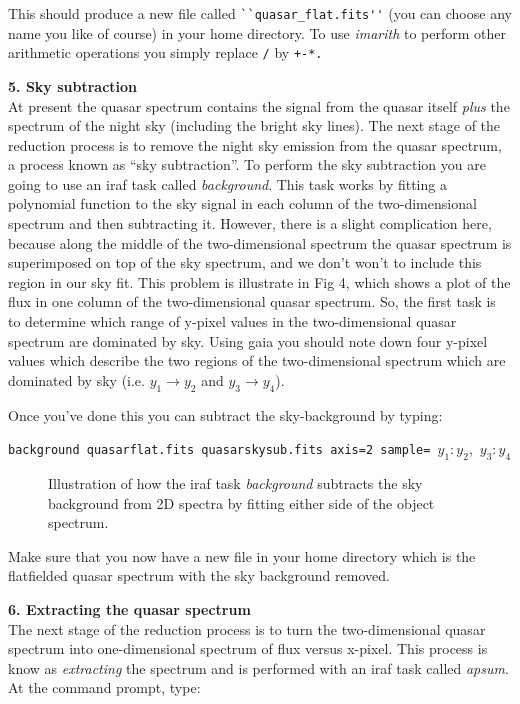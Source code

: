 This should produce a new file called \verb,``quasar_flat.fits'', (you can
choose any name you like of course) in your home directory. To use
{\it imarith} to perform other arithmetic operations you simply
replace \verb,/, by \verb,+-*.,

{\large {\bf 5. Sky subtraction}}\\
At present the quasar spectrum contains the signal from the quasar
itself {\it plus} the spectrum of the night sky (including the bright
sky lines). The next stage of the reduction process is to remove the
night sky emission from the quasar spectrum, a process known as ``sky
subtraction''. To perform the sky subtraction you are going to use an
{\sc iraf} task called {\it background}. This task works by fitting a
polynomial function to the sky signal in each column of the
two-dimensional spectrum and then subtracting it. However, there is a
slight complication here, because along the middle of the
two-dimensional spectrum the quasar spectrum is superimposed on top of
the sky spectrum, and we don't won't to include this region in our sky
fit. This problem is illustrate in Fig 4, which shows a plot of the
flux in one column of the two-dimensional quasar spectrum. So, the
first task is to determine which range of y-pixel values in the
two-dimensional quasar spectrum are dominated by sky. Using {\sc gaia}
you should note down four y-pixel values which describe the
two regions of the two-dimensional spectrum which are dominated by sky
(i.e. $y_1 \rightarrow y_2$ and $y_3 \rightarrow y_4$).



Once you've done this you can subtract the sky-background by typing:

{\tt background quasarflat.fits quasarskysub.fits axis=2 sample= }$y_1:y_2,$ $y_3:y_4$


\begin{figure}
\centerline{}
\caption{Illustration of how the {\sc iraf} task {\it background}
subtracts the sky background from 2D spectra by fitting either side of
the object spectrum.}
\end{figure}

Make sure that you now have a new file in your home directory which is
the flatfielded quasar spectrum with the sky background removed.


{\large {\bf 6. Extracting the quasar spectrum }}\\
The next stage of the reduction process is to turn the two-dimensional
quasar spectrum into one-dimensional spectrum of flux versus
x-pixel. This process is know as {\it extracting} the spectrum and is
performed with an {\sc iraf} task called {\it apsum}. At the command
prompt, type:

